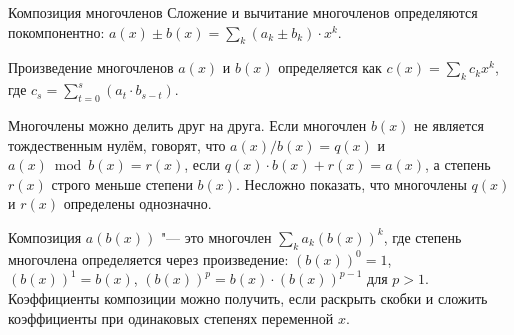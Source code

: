 \begin{problem}{Композиция многочленов}
Сложение и вычитание многочленов определяются покомпонентно:
$a(x) \pm b(x) = \sum \limits _k (a_k \pm b_k) \cdot x^k$.

Произведение многочленов $a(x)$ и $b(x)$ определяется как
$c(x) = \sum \limits _k c_k x^k$, где
$c_s = \sum \limits _{t = 0} ^{s} (a_t \cdot b_{s - t})$.

Многочлены можно делить друг на друга.
Если многочлен $b(x)$ не является тождественным нулём,
говорят, что $a(x) / b(x) = q(x)$ и $a(x) \bmod b(x) = r(x)$, если
$q(x) \cdot b(x) + r(x) = a(x)$, а степень $r(x)$ строго меньше
степени $b(x)$.
Несложно показать, что многочлены $q(x)$ и $r(x)$ определены однозначно.

Композиция $a(b(x))$ "--- это многочлен $\sum \limits _k a_k (b(x))^k$,
где степень многочлена определяется через произведение: $(b(x))^0 = 1$,
$(b(x))^1 = b(x)$, $(b(x))^p = b(x) \cdot (b(x))^{p - 1}$ для $p > 1$.
Коэффициенты композиции можно получить, если раскрыть скобки
и сложить коэффициенты при одинаковых степенях переменной $x$.

\end{problem}
